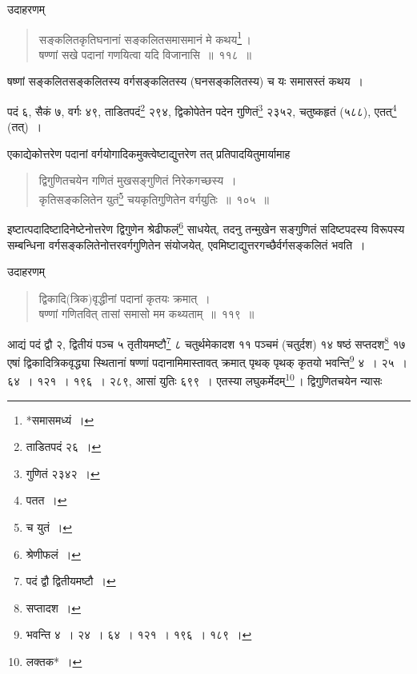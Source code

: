\documentclass[10pt, openany]{book}
\begin{document}
{{{{{{{{{{{{{{\newpage

{उदाहरणम्\textemdash}

\begin{quote}
    
 {\eg सङ्कलितकृतिघनानां सङ्कलितसमासमानं मे कथय\renewcommand{\thefootnote}{१}\footnote{*समासमध्यं~।}\,।\\
 षण्णां सखे पदानां गणयित्वा यदि विजानासि~॥~११८~॥}\end{quote}

{षष्णां सङ्कलितसङ्कलितस्य वर्गसङ्कलितस्य (घनसङ्कलितस्य) च यः समासस्तं}
{कथय~।}
\vspace{3mm}

{पदं ६, सैकं ७, वर्गः ४९, ताडितपदं\renewcommand{\thefootnote}{२}\footnote{ताडितपदं २६~।} २९४, द्विकोपेतेन पदेन गुणितं\renewcommand{\thefootnote}{३}\footnote{गुणितं २३४२~।}   २३५२,}
{चतुष्कहृतं (५८८), एतत्\renewcommand{\thefootnote}{४}\footnote{पतत~।}   (तत्)~।}
\vspace{3mm}

{एकाद्येकोत्तरेण पदानां वर्गयोगादिकमुक्त्वेष्टाद्युत्तरेण तत्
प्रतिपादयितुमार्यामाह\textemdash}

 \label{105}
\begin{quote}
    
{\bs द्विगुणितचयेन गणितं मुखसङ्गुणितं निरेकगच्छस्य~। \\
 कृतिसङ्कलितेन युतं\renewcommand{\thefootnote}{५}\footnote{च युतं~।} चयकृतिगुणितेन वर्गयुतिः~॥~१०५~॥}\end{quote}

{इष्टात्पदादिष्टादिनेष्टेनोत्तरेण द्विगुणेन श्रेढीफलं\renewcommand{\thefootnote}{६}\footnote{श्रेणीफलं~।} साधयेत्, तदनु
तन्मुखेन सङ्गुणितं}
{सदिष्टपदस्य विरूपस्य सम्बन्धिना वर्गसङ्कलितेनोत्तरवर्गगुणितेन संयोजयेत्, एवमिष्टाद्युत्तरगच्छैर्वर्गसङ्कलितं भवति~।}
\vspace{3mm}

{उदाहरणम्\textemdash}

\begin{quote}
    
{\eg द्विकादि(त्रिक)वृद्धीनां पदानां कृतयः क्रमात्~। \\
 षण्णां गणितवित् तासां समासो मम कथ्यताम्~॥~११९~॥}\end{quote}

{आद्यं पदं द्वौ २, द्वितीयं पञ्च ५ तृतीयमष्टौ\renewcommand{\thefootnote}{७}\footnote{पदं द्वौ द्वितीयमष्टौ~।} ८ चतुर्थमेकादश ११
पञ्चमं (चतुर्दश)}
{१४ षष्ठं सप्तदश\renewcommand{\thefootnote}
{८}\footnote{सप्तादश~।} १७ एषां द्विकादित्रिकवृद्ध्या स्थितानां षण्णां
पदानामिमास्तावत् क्रमात्}
{पृथक् पृथक् कृतयो भवन्ति\renewcommand{\thefootnote}
{९}\footnote{भवन्ति ४~। २४~। ६४~। १२१~।  
१९६~। १८९~।} ४~। २५~। ६४~। १२१~। १९६~। २८९, आसां युतिः
६९९~।}
{एतस्या लघुकर्मेदम्\renewcommand{\thefootnote}
{१०}\footnote{लक्तक*~।}\,। द्विगुणितचयेन न्यासः\textemdash}
\vspace{3mm}
 
}}}}}}}}}}}}}}
\end{document}
